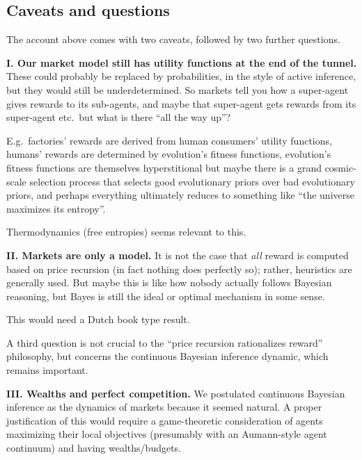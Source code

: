 \begin{subappendices}

\section{Caveats and questions}\label{agency:sec:caveats}

The account above comes with two caveats, followed by two further questions.

\textbf{I. Our market model still has utility functions at the end of the tunnel.} These could
probably be replaced by probabilities, in the style of active inference, but they would
still be underdetermined. So markets tell you how a super-agent gives rewards to its
sub-agents, and maybe that super-agent gets rewards from its super-agent etc.\ but what is
there ``all the way up''?

E.g.\ factories' rewards are derived from human consumers' utility functions, humans'
rewards are determined by evolution's fitness functions, evolution's fitness functions are
themselves hyperstitional but maybe there is a grand cosmic-scale selection process that
selects good evolutionary priors over bad evolutionary priors, and perhaps everything
ultimately reduces to something like ``the universe maximizes its entropy''.

Thermodynamics (free entropies) seems relevant to this.

\textbf{II. Markets are only a model.} It is not the case that \emph{all} reward is
computed based on price recursion (in fact nothing does perfectly so); rather, heuristics are generally
used. But maybe this is like how nobody actually follows Bayesian reasoning, but
Bayes is still the ideal or optimal mechanism in some sense.

This would need a Dutch book type result.

A third question is not crucial to the ``price recursion rationalizes reward'' philosophy,
but concerns the continuous Bayesian inference dynamic, which remains important.

\textbf{III. Wealths and perfect competition.} We postulated continuous Bayesian
inference as the dynamics of markets because it seemed natural. A proper justification of this
would require a game-theoretic consideration of agents maximizing their local objectives
(presumably with an Aumann-style agent continuum) and having wealths/budgets.


\end{subappendices}
